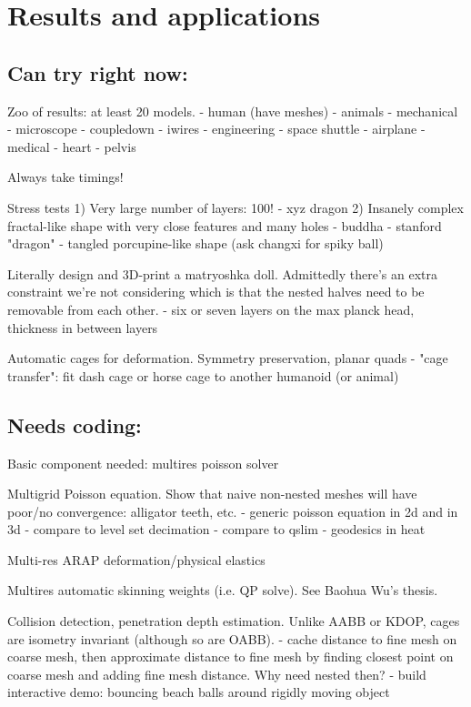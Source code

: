 
\section{Results and applications}
\label{sec:results}

\subsection{Can try right now:}

Zoo of results: at least 20 models.
  - human (have meshes)
  - animals
  - mechanical
    - microscope
    - coupledown
    - iwires
  - engineering
    - space shuttle
    - airplane
  - medical
    - heart
    - pelvis

Always take timings!

Stress tests
  1) Very large number of layers: 100!
    - xyz dragon
  2) Insanely complex fractal-like shape with very close features and many holes
    - buddha
    - stanford "dragon"
    - tangled porcupine-like shape (ask changxi for spiky ball)

Literally design and 3D-print a matryoshka doll. Admittedly there's an extra
constraint we're not considering which is that the nested halves need to be
removable from each other.
  - six or seven layers on the max planck head, thickness in between layers

Automatic cages for deformation. Symmetry preservation, planar quads
  - "cage transfer": fit dash cage or horse cage to another humanoid (or
    animal)

\subsection{Needs coding:}

Basic component needed: multires poisson solver

Multigrid Poisson equation. Show that naive non-nested meshes will have
poor/no convergence: alligator teeth, etc.
  - generic poisson equation in 2d and in 3d
    - compare to level set decimation
    - compare to qslim
  - geodesics in heat 

Multi-res ARAP deformation/physical elastics

Multires automatic skinning weights (i.e. QP solve). See Baohua Wu's thesis.

Collision detection, penetration depth estimation. Unlike AABB or KDOP, cages
are isometry invariant (although so are OABB).
  - cache distance to fine mesh on coarse mesh, then approximate distance to
    fine mesh by finding closest point on coarse mesh and adding fine mesh
    distance. Why need nested then?
  - build interactive demo: bouncing beach balls around rigidly moving object

